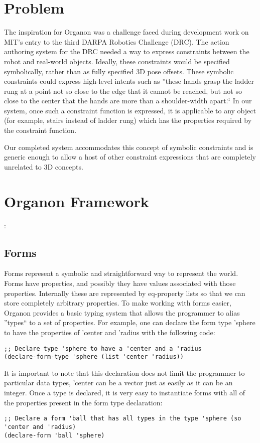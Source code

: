 \documentclass[12pt,a4paper]{article}
\begin{document}
\section{Problem}
The inspiration for Organon was a challenge faced during development work on MIT's entry to the third DARPA Robotics Challenge (DRC). The action authoring system for the DRC needed a way to express constraints between the robot and real-world objects. Ideally, these constraints would be specified symbolically, rather than as fully specified 3D pose offsets. These symbolic constraints could express high-level intents such as ''these hands grasp the ladder rung at a point not so close to the edge that it cannot be reached, but not so close to the center that the hands are more than a shoulder-width apart.`` In our system, once such a constraint function is expressed, it is applicable to any object (for example, stairs instead of  ladder rung) which has the properties required by the constraint function.

Our completed system accommodates this concept of symbolic constraints and is generic enough to allow a host of other constraint expressions that are completely unrelated to 3D concepts.

\section{Organon Framework}:

\subsection{Forms}
Forms represent a symbolic and straightforward way to represent the world.  Forms have properties, and possibly they have values associated with those properties.  Internally these are represented by eq-property lists so that we can store completely arbitrary properties.  To make working with forms easier, Organon provides a basic typing system that allows the programmer to alias ''types`` to a set of properties. For example, one can declare the form type 'sphere to have the properties of 'center and 'radius with the following code:

\begin{lstlisting}
;; Declare type 'sphere to have a 'center and a 'radius
(declare-form-type 'sphere (list 'center 'radius)) 
\end{lstlisting}

It is important to note that this declaration does not limit the programmer to particular data types, 'center can be a vector just as easily as it can be an integer.  Once a type is declared, it is very easy to instantiate forms with all of the properties present in the form type declaration:
\begin{lstlisting}
;; Declare a form 'ball that has all types in the type 'sphere (so 'center and 'radius)
(declare-form 'ball 'sphere) 
\end{lstlisting}
\end{document}
